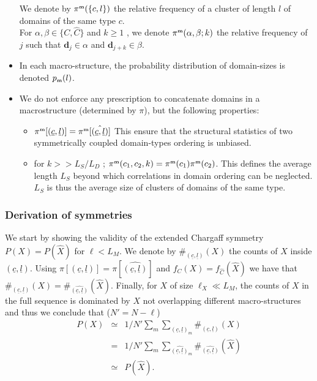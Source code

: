 \documentclass[fleqn,10pt]{wlscirep}
\def\sm{\textbf{\tiny m}}
\begin{document}
\begin{itemize}
We denote by $\pi^{\sm}(\{c,l\})$  the relative frequency of a cluster of length $l$ of domains of the same type $c$.
\\
 For $\alpha,\beta\in  \{ C,\hat{C}\}$ and $k\ge 1$ , we denote  $\pi^{\sm}(\alpha,\beta;k)$ 
 the relative frequency of  $j$ such that  $\textbf{d}_j \in \alpha$ and $\textbf{d}_{j+k} \in \beta$. 
\\

\item In each macro-structure, the probability distribution  of domain-sizes  is denoted  $p_{\sm}(l)$. 

 \item  We do not enforce any prescription to concatenate domains in a macrostructure (determined  by $\pi$), but the following properties:
  \begin{itemize}

 \item  $\pi^{\sm}[(\underline{c},\underline{l})]=\pi^{\sm}[\hat{(\underline{c},\underline{l})}]$ This ensure that  the  structural statistics of  two symmetrically coupled domain-types ordering is unbiased.

 \item for $k>>L_S/L_D$ ; $\pi^{\sm}(c_1,c_2,k)=\pi^{\sm}(c_1)\pi^{\sm}(c_2)$. This defines the average length $L_S$ beyond which   correlations in domain ordering can be neglected. $L_S $ is  thus the average size of clusters of domains of the same type.
 \end{itemize} 

\end{itemize}

\subsubsection*{Derivation of symmetries}

We start by showing the validity of the extended Chargaff symmetry $P(X) = P(\hat{X})$ for $\ell < L_M$. We denote by $\#_{ (\underline{c},\underline{l})}(X) $ the counts of $X$ inside  $(\underline{c},\underline{l})$. Using $\pi[(\underline{c},\underline{l})] = \pi[\hat{(\underline{c},\underline{l})}]$ and $f_{C}(X)=f_{\hat{C}}(\hat{X})$  we have that $\#_{ (\underline{c},\underline{l})}(X) = \#_{ \hat{(\underline{c},\underline{l})}}(\hat{X}) $. Finally, for  $X$ of size $\ell_X \ll L_M$, the counts of $X$ in the full sequence is dominated by $X$ not overlapping different macro-structures and thus we conclude that ($N'=N-\ell$)
\begin{eqnarray}\label{first}
P(X) &\simeq& 1/N'\sum_{m} \sum_{(\underline{c},\underline{l})_m} \#_{ (\underline{c},\underline{l})}(X) \nonumber\\
&= &1/N' \sum_{m} \sum_{\hat{(\underline{c},\underline{l})}_m} \#_{ \hat{(\underline{c},\underline{l})}}(\hat{X})\nonumber\\
&\simeq& P(\hat{X}).
\end{eqnarray}
\end{document}

